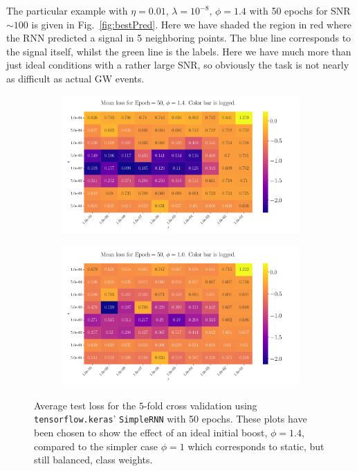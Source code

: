 \documentclass[%
reprint,
amsmath,amssymb,
aps,
]{revtex4-2}
\begin{document}
The particular example with $\eta=0.01$, $\lambda=10^{-8}$, $\phi=1.4$ with 50 epochs for SNR $\sim100$ is given in Fig.~\ref{fig:bestPred}. Here we have shaded the region in red where the RNN predicted a signal in 5 neighboring points. The blue line corresponds to the signal itself, whilst the green line is the labels. Here we have much more than just ideal conditions with a rather large SNR, so obviously the task is not nearly as difficult as actual GW events. 

\begin{figure}[H]
	\begin{subfigure}{0.499\textwidth}
		\includegraphics[width=\textwidth]{Figures/RNN_2D_Plot_Loss_Epoch50_Boost1.4.pdf}
	\end{subfigure}
	\newline
	\begin{subfigure}{0.499\textwidth}
		\includegraphics[width=\textwidth]{Figures/RNN_2D_Plot_Loss_Epoch50_Boost1.0.pdf}
	\end{subfigure}
	\caption{Average test loss for the $5$-fold cross validation using \texttt{tensorflow.keras}' \texttt{SimpleRNN} with 50 epochs. These plots have been chosen to show the effect of an ideal initial boost, $\phi=1.4$, compared to the simpler case $\phi=1$ which corresponds to static, but still balanced, class weights.}
	\label{fig:PhiShowcase}	
\end{figure}
\end{document}

